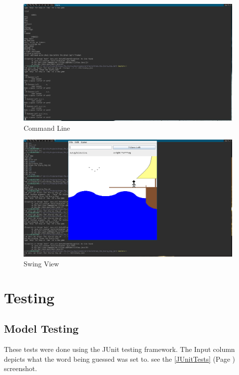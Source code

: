\documentclass[a4paper, 11pt]{article}
\begin{document}
\begin{landscape}

\begin{figure}[H]
\centering
\includegraphics[scale=0.5]{./res/CliView.png}
\caption{Command Line}
\label{CliViewFinished}
\end{figure}

\begin{figure}[H]
\centering
\includegraphics[scale=0.5]{./res/SwingView.png}
\caption{Swing View}
\label{SwingViewFinished}
\end{figure}

\end{landscape}
\section{Testing}

\subsection{Model Testing}

These tests were done using the JUnit testing framework. The Input column depicts what the word being guessed was set to. see the \ref{JUnitTests} (Page \pageref{JUnitTests}) screenshot.
\end{document}
